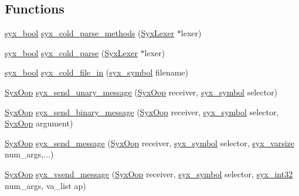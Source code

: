 \subsection*{Functions}
\begin{CompactItemize}
\item 
\hyperlink{syx-types_8h_c6dc09b276b99fa1956364359139daab}{syx\_\-bool} \hyperlink{syx-utils_8c_e258bc887d76d77c7ba41ec4a7bf962d}{syx\_\-cold\_\-parse\_\-methods} (\hyperlink{struct_syx_lexer}{SyxLexer} $\ast$lexer)
\item 
\hyperlink{syx-types_8h_c6dc09b276b99fa1956364359139daab}{syx\_\-bool} \hyperlink{syx-utils_8c_302b958f3a3125db9cfd393c0778d476}{syx\_\-cold\_\-parse} (\hyperlink{struct_syx_lexer}{SyxLexer} $\ast$lexer)
\item 
\hyperlink{syx-types_8h_c6dc09b276b99fa1956364359139daab}{syx\_\-bool} \hyperlink{syx-utils_8c_1684cfdb905b7f4de7031d77bba8e6b3}{syx\_\-cold\_\-file\_\-in} (\hyperlink{syx-types_8h_9663af54b7b72f5d8be5f754ef356525}{syx\_\-symbol} filename)
\item 
\hyperlink{syx-types_8h_1121caba2d40b2ce090b640762744ccd}{SyxOop} \hyperlink{syx-utils_8c_d3f4d38a5a1230e366dc21594ea28832}{syx\_\-send\_\-unary\_\-message} (\hyperlink{syx-types_8h_1121caba2d40b2ce090b640762744ccd}{SyxOop} receiver, \hyperlink{syx-types_8h_9663af54b7b72f5d8be5f754ef356525}{syx\_\-symbol} selector)
\item 
\hyperlink{syx-types_8h_1121caba2d40b2ce090b640762744ccd}{SyxOop} \hyperlink{syx-utils_8c_48a0ba618561692f6c1858fcbc5d63f6}{syx\_\-send\_\-binary\_\-message} (\hyperlink{syx-types_8h_1121caba2d40b2ce090b640762744ccd}{SyxOop} receiver, \hyperlink{syx-types_8h_9663af54b7b72f5d8be5f754ef356525}{syx\_\-symbol} selector, \hyperlink{syx-types_8h_1121caba2d40b2ce090b640762744ccd}{SyxOop} argument)
\item 
\hyperlink{syx-types_8h_1121caba2d40b2ce090b640762744ccd}{SyxOop} \hyperlink{syx-utils_8c_afc33eb59faf7d968421f87303a86512}{syx\_\-send\_\-message} (\hyperlink{syx-types_8h_1121caba2d40b2ce090b640762744ccd}{SyxOop} receiver, \hyperlink{syx-types_8h_9663af54b7b72f5d8be5f754ef356525}{syx\_\-symbol} selector, \hyperlink{syx-types_8h_18e1a1417591a1efb670b97ce320f535}{syx\_\-varsize} num\_\-args,...)
\item 
\hyperlink{syx-types_8h_1121caba2d40b2ce090b640762744ccd}{SyxOop} \hyperlink{syx-utils_8c_37be9deb681cffcf8f9301dc95e31d5e}{syx\_\-vsend\_\-message} (\hyperlink{syx-types_8h_1121caba2d40b2ce090b640762744ccd}{SyxOop} receiver, \hyperlink{syx-types_8h_9663af54b7b72f5d8be5f754ef356525}{syx\_\-symbol} selector, \hyperlink{syx-types_8h_9f31c17555a2dfcf25da84b5c4a2e55b}{syx\_\-int32} num\_\-args, va\_\-list ap)

\end{CompactItemize}
